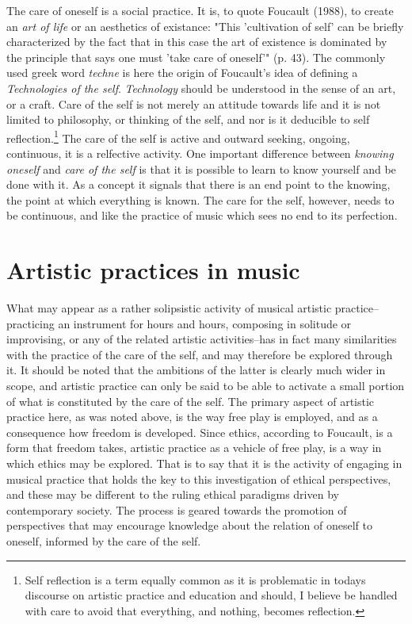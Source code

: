 \documentclass[11pt]{article}
\makeatletter
\newcommand{\cslcitation}[2]
 {\protect\hyper@linkstart{cite}{citeproc_bib_item_#1}#2\hyper@linkend}
\makeatother
\begin{document}
The care of oneself is a social practice. It is, to quote  Foucault (\cslcitation{7}{1988}), to create an \emph{art of life} or an aesthetics of existance: "This 'cultivation of self' can be briefly characterized by the fact that in this case the art of existence is dominated by the principle that says one must 'take care of oneself'" (p. 43). The commonly used greek word \emph{techne} is here the origin of Foucault's idea of defining a \emph{Technologies of the self}. \emph{Technology} should be understood in the sense of an art, or a craft. Care of the self is not merely an attitude towards life and it is not limited to philosophy, or thinking of the self, and nor is it deducible to self reflection.\footnote{Self reflection is a term equally common as it is problematic in todays discourse on artistic practice and education and should, I believe be handled with care to avoid that everything, and nothing, becomes reflection.} The care of the self is active and outward seeking, ongoing, continuous, it is a relfective activity. One important difference between \emph{knowing oneself} and \emph{care of the self} is that it is possible to learn to know yourself and be done with it. As a concept it signals that there is an end point to the knowing, the point at which everything is known.  The care for the self, however, needs to be continuous, and like the practice of music which sees no end to its perfection.
\section*{Artistic practices in music}
\label{sec:orgb52482b}
What may appear as a rather solipsistic activity of musical artistic practice--practicing an instrument for hours and hours, composing in solitude or improvising, or any of the related artistic activities--has in fact many similarities with the practice of the care of the self, and may therefore be explored through it. It should be noted that the ambitions of the latter is clearly much wider in scope, and artistic practice can only be said to be able to activate a small portion of what is constituted by the care of the self. The primary aspect of artistic practice here, as was noted above, is the way free play is employed, and as a consequence how freedom is developed.
Since ethics, according to Foucault, is a form that freedom takes, artistic practice as a vehicle of free play, is a way in which ethics may be explored. That is to say that it is the activity of engaging in musical practice that holds the key to this investigation of ethical perspectives, and these may be different to the ruling ethical paradigms driven by contemporary society. The process is geared towards the promotion of perspectives that may encourage knowledge about the relation of oneself to oneself, informed by the care of the self.
\end{document}
